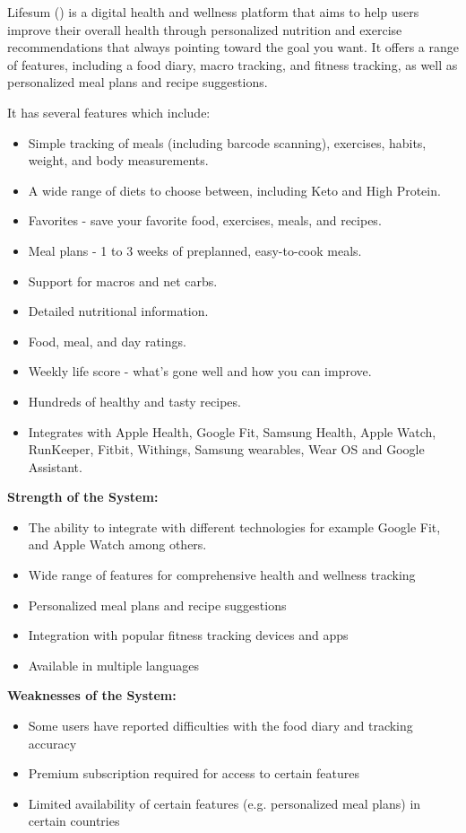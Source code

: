 \documentclass{article}
\begin{document}
Lifesum (\cite{lifesum}) is a digital health and wellness platform that aims to help users improve their overall health through personalized nutrition and exercise recommendations that always pointing toward the goal you want. It offers a range of features, including a food diary, macro tracking, and fitness tracking, as well as personalized meal plans and recipe suggestions.

It has several features which include:
\begin{itemize}
\item Simple tracking of meals (including barcode scanning), exercises, habits, weight, and body measurements.
\item A wide range of diets to choose between, including Keto and High Protein.
\item Favorites - save your favorite food, exercises, meals, and recipes.
\item Meal plans - 1 to 3 weeks of preplanned, easy-to-cook meals.
\item Support for macros and net carbs.
\item Detailed nutritional information.
\item Food, meal, and day ratings.
\item Weekly life score - what's gone well and how you can improve.
\item Hundreds of healthy and tasty recipes.
\item Integrates with Apple Health, Google Fit, Samsung Health, Apple Watch, RunKeeper, Fitbit, Withings, Samsung wearables, Wear OS and Google Assistant.
\end{itemize}

\textbf{Strength of the System:}
\begin{itemize}
\item The ability to integrate with different technologies for example Google Fit, and Apple Watch among others.
\item Wide range of features for comprehensive health and wellness tracking
\item Personalized meal plans and recipe suggestions
\item Integration with popular fitness tracking devices and apps
\item Available in multiple languages
\end{itemize}

\textbf{Weaknesses of the System:}
\begin{itemize}
\item Some users have reported difficulties with the food diary and tracking accuracy
\item Premium subscription required for access to certain features
\item Limited availability of certain features (e.g. personalized meal plans) in certain countries
\end{itemize}
\end{document}
